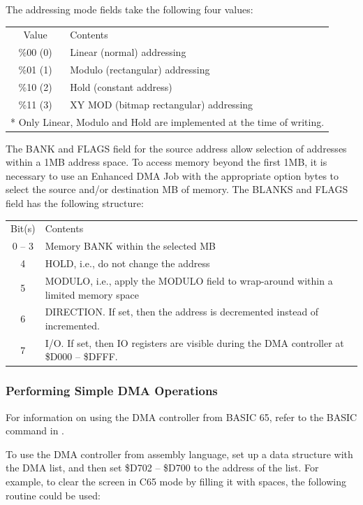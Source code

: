 The addressing mode fields take the following four values:

\begin{tabular}{|c|l|}
  \hline
  Value & Contents \\
  \%00 (0) & Linear (normal) addressing \\
  \%01 (1) & Modulo (rectangular) addressing \\
  \%10 (2) & Hold (constant address) \\
  \%11 (3) & XY MOD (bitmap rectangular) addressing \\
  \hline
  \multicolumn{2}{l}{* Only Linear, Modulo and Hold are implemented at the time of writing.}
\end{tabular}

The BANK and FLAGS field for the source address allow selection of addresses within a 1MB
address space. To access memory beyond the first 1MB, it is necessary to use an Enhanced DMA
Job with the appropriate option bytes to select the source and/or destination MB of memory.
The BLANKS and FLAGS field has the following structure:

\begin{tabular}{|c|l|}
  \hline
  Bit(s) & Contents \\
  0 -- 3 & Memory BANK within the selected MB \\
  4 & HOLD, i.e., do not change the address \\
  5 & MODULO, i.e., apply the MODULO field to wrap-around within a limited memory space \\
  6 & DIRECTION. If set, then the address is decremented instead of incremented. \\
  7 & I/O. If set, then IO registers are visible during the DMA controller at \$D000 -- \$DFFF. \\
  \hline
\end{tabular}

\subsubsection{Performing Simple DMA Operations}

For information on using the DMA controller from BASIC 65, refer to the  BASIC command in .

To use the DMA controller from assembly language, set up a data structure with the DMA list, and then
set \$D702 -- \$D700 to the address of the list. For example, to clear the screen in C65 mode by filling
it with spaces, the following routine could be used:

